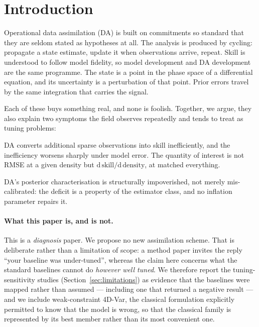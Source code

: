 \section{Introduction}
\label{sec:intro}

Operational data assimilation (DA) is built on commitments so standard that they
are seldom stated as hypotheses at all. The analysis is produced by cycling:
propagate a state estimate, update it when observations arrive, repeat. Skill is
understood to follow model fidelity, so model development and DA development are
the same programme. The state is a point in the phase space of a differential
equation, and its uncertainty is a perturbation of that point. Prior errors
travel by the same integration that carries the signal.

Each of these buys something real, and none is foolish. Together, we argue, they
also explain two symptoms the field observes repeatedly and tends to treat as
tuning problems:

\begin{description}[leftmargin=2em,style=nextline]
  \item[\textnormal{\textbf{S-a --- the marginal value of observations.}}]
    DA converts additional sparse observations into skill inefficiently, and the
    inefficiency worsens sharply under model error. The quantity of interest is
    not RMSE at a given density but
    $\mathrm{d}\,\text{skill}/\mathrm{d}\,\text{density}$, at matched everything.
  \item[\textnormal{\textbf{S-b --- posterior quality.}}]
    DA's posterior characterisation is structurally impoverished, not merely
    mis-calibrated: the deficit is a property of the estimator class, and no
    inflation parameter repairs it.
\end{description}

\paragraph{What this paper is, and is not.}
This is a \emph{diagnosis} paper. We propose no new assimilation scheme. That is
deliberate rather than a limitation of scope: a method paper invites the reply
``your baseline was under-tuned'', whereas the claim here concerns what the
standard baselines cannot do \emph{however well tuned}. We therefore report the
tuning-sensitivity studies (Section~\ref{sec:limitations}) as evidence that the
baselines were mapped rather than assumed --- including one that returned a
negative result --- and we include weak-constraint 4D-Var, the classical
formulation explicitly permitted to know that the model is wrong, so that the
classical family is represented by its best member rather than its most
convenient one.

